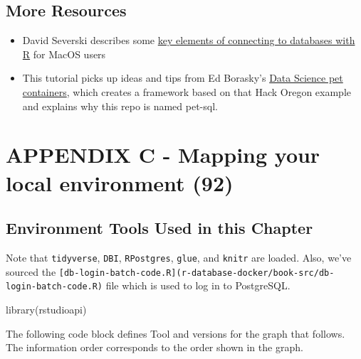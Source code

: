 \documentclass[]{book}
\providecommand{\tightlist}{%
  \setlength{\itemsep}{0pt}\setlength{\parskip}{0pt}}
\theoremstyle{definition}
\theoremstyle{definition}
\theoremstyle{definition}
\theoremstyle{remark}
\begin{document}
\hypertarget{more-resources}{%
\section{More Resources}\label{more-resources}}

\begin{itemize}
\tightlist
\item
  David Severski describes some
  \href{https://github.com/davidski/database_connections}{key elements
  of connecting to databases with R} for MacOS users
\item
  This tutorial picks up ideas and tips from Ed Borasky's
  \href{https://github.com/hackoregon/data-science-pet-containers}{Data
  Science pet containers}, which creates a framework based on that Hack
  Oregon example and explains why this repo is named pet-sql.
\end{itemize}

\hypertarget{appendix-c---mapping-your-local-environment-92}{%
\chapter{APPENDIX C - Mapping your local environment
(92)}\label{appendix-c---mapping-your-local-environment-92}}

\hypertarget{environment-tools-used-in-this-chapter}{%
\section{Environment Tools Used in this
Chapter}\label{environment-tools-used-in-this-chapter}}

Note that \texttt{tidyverse}, \texttt{DBI}, \texttt{RPostgres},
\texttt{glue}, and \texttt{knitr} are loaded. Also, we've sourced the
\texttt{{[}db-login-batch-code.R{]}(\textquotesingle{}r-database-docker/book-src/db-login-batch-code.R\textquotesingle{})}
file which is used to log in to PostgreSQL.

library(rstudioapi)

The following code block defines Tool and versions for the graph that
follows. The information order corresponds to the order shown in the
graph.
\end{document}
